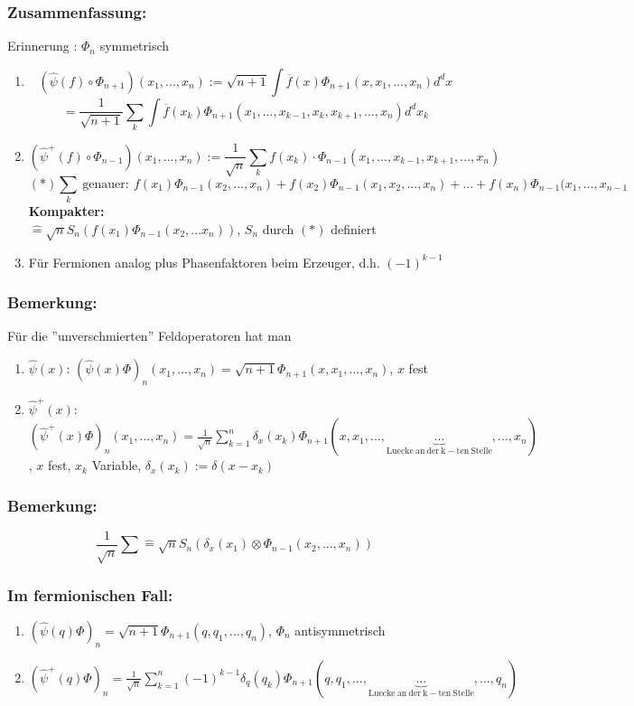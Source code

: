 \documentclass[twoside,a4paper]{scrartcl}
\renewcommand{\1}{\mathds{1}}
\begin{document}
\subsubsection*{Zusammenfassung:}
Erinnerung : $\Phi_n$ symmetrisch
\begin{enumerate}
\item $$(\hat \psi(f)\circ \Phi_{n+1})(x_1,...,x_n):=\sqrt{n+1} \int \overline{f}(x) \Phi_{n+1}(x,x_1,...,x_n)d^dx$$
$$=\frac{1}{\sqrt{n+1}} \sum_k \int \overline{f}(x_k) \Phi_{n+1}(x_1,...,x_{k-1},x_k,x_{k+1},...,x_n)d^dx_k$$
\item $$(\hat \psi^+(f)\circ \Phi_{n-1})(x_1,...,x_n):=\frac{1}{\sqrt{n}} \sum_k f(x_k)\cdot \Phi_{n-1}(x_1,...,x_{k-1},x_{k+1},...,x_n)$$
$$(*) \sum_k \ \mathrm{genauer:} \ f(x_1)\Phi_{n-1}(x_2,...,x_n)+f(x_2)\Phi_{n-1}(x_1,x_2,...,x_n)+...+ f(x_n)\Phi_{n-1}(x_1,...,x_{n-1}$$
\textbf{Kompakter:}\\
$\mathrel{\widehat{=}} \sqrt{n} S_n(f(x_1) \Phi_{n-1}(x_2,...x_n))$, $S_n$ durch $(*)$ definiert
\item Für Fermionen analog plus Phasenfaktoren beim Erzeuger, d.h. $(-1)^{k-1}$
\end{enumerate}
\subsubsection*{Bemerkung:}
Für die ''unverschmierten'' Feldoperatoren hat man 
\begin{enumerate}
\item $\hat \psi(x)$: $(\hat \psi(x)\Phi)_n(x_1,...,x_n)=\sqrt{n+1}\Phi_{n+1}(x,x_1,...,x_n)$, $x$ fest
\item $\hat \psi^+(x)$: $(\hat \psi^+(x)\Phi)_n(x_1,...,x_n)=\frac{1}{\sqrt{n}}\sum_{k=1}^n \delta_x(x_k) \Phi_{n+1}(x,x_1,...,\underbrace{...}_{\mathrm{Luecke \ an \ der \ k-ten \ Stelle}},...,x_n)$, $x$ fest, $x_k$ Variable, $\delta_x(x_k):=\delta(x-x_k)$
\end{enumerate}
\subsubsection*{Bemerkung:}
$$\frac{1}{\sqrt{n}}\sum \mathrel{\widehat{=}} \sqrt{n} S_n(\delta_x(x_1)\otimes \Phi_{n-1}(x_2,...,x_n))$$
\subsubsection*{Im fermionischen Fall:}
\begin{enumerate}
\item $(\hat \psi(q)\Phi)_n=\sqrt{n+1}\Phi_{n+1}(q,q_1,...,q_n)$, $\Phi_n$ antisymmetrisch
\item $(\hat \psi^+(q)\Phi)_n=\frac{1}{\sqrt{n}}\sum_{k=1}^n (-1)^{k-1}\delta_q(q_k) \Phi_{n+1}(q,q_1,...,\underbrace{...}_{\mathrm{Luecke \ an \ der \ k-ten \ Stelle}},...,q_n)$
\end{enumerate}
\end{document}
